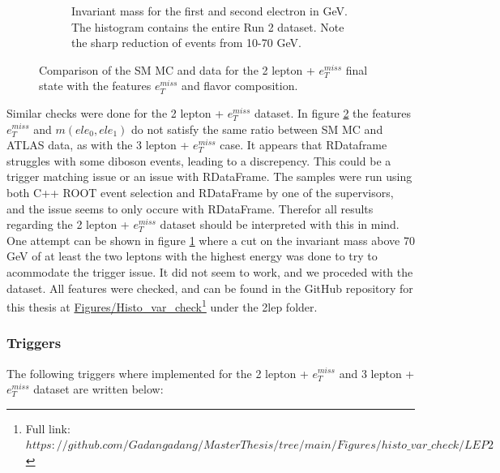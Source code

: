 \begin{figure}[H]
\begin{subfigure}{.6\textwidth}
        \caption{Invariant mass for the first and second electron in GeV. The histogram contains the entire Run 2 dataset. Note the sharp reduction of events from 10-70 GeV.}
        \label{fig:mll_2lep}
    \end{subfigure}
    \hfill        
    \caption[2 lepton + $e_T^{miss}$ Monte Carlo and ATLAS data comparison]{Comparison of the SM MC and data for the 2 lepton + $e_T^{miss}$ final state with the features $e_{T}^{miss}$ and flavor composition.
    }
    \label{fig:MC_Data_comp_2lep}
\end{figure}

Similar checks were done for the 2 lepton + $e_T^{miss}$ dataset. In figure \ref{fig:MC_Data_comp_2lep} the features $e_T^{miss}$ and $m(ele_0, ele_1)$ 
do not satisfy the same ratio between SM MC and ATLAS data, as with the 3 lepton + $e_T^{miss}$ case. It appears that RDataframe struggles with some diboson events, 
leading to a discrepency. This could be a trigger matching issue or an issue with RDataFrame. The samples were run using both C++ ROOT event selection and RDataFrame by one of the supervisors, and the 
issue seems to only occure with RDataFrame. Therefor all results regarding the 2 lepton + $e_T^{miss}$ dataset should be interpreted with this in mind. One attempt can be shown in 
figure \ref{fig:mll_2lep} where a cut on the invariant mass above 70 GeV of at least the two leptons with the highest energy was done to try to acommodate the trigger issue. 
It did not seem to work, and we proceded with the dataset. All features were checked, and can be found in the GitHub repository for this thesis at 
\href{https://github.com/Gadangadang/MasterThesis/tree/main}{Figures/Histo\_var\_check}\footnote{Full link: \href{https://github.com/Gadangadang/MasterThesis/tree/main/Figures/histo_var_check/LEP2}{$https://github.com/Gadangadang/MasterThesis/tree/main/Figures/histo\_var\_check/LEP2$}} under the 2lep folder.



\subsubsection*{Triggers }\label{sec:triggers}

The following triggers where implemented for the 2 lepton + $e_T^{miss}$  and 3 lepton + $e_T^{miss}$ dataset are written below:


